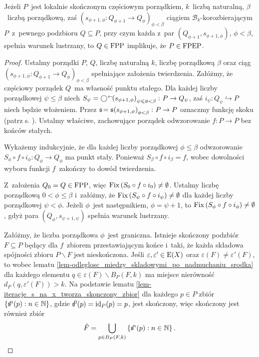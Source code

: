 \begin{tw}\label{tw-loc_fin_fpp_thm_dism_1}
Jeżeli $P$~jest lokalnie skończonym częściowym porządkiem, $k$~liczbą naturalną, $\beta$~liczbą porządkową, zaś $\left(s_{\phi+1,\phi}\colon Q_{\phi+1}\to Q_\phi\right)_{\phi<\beta}$ ciągiem \mbox{$\mathcal{B}_k$-korozbierającym} $P$~z~pewnego podzbioru $Q\subseteq P$, przy czym każda z~par $\left(Q_{\phi+1},s_{\phi+1,\phi}\right)$, $\phi<\beta$, spełnia warunek lustrzany, to $Q\in\mathrm{FPP}$ implikuje, że $P\in\mathrm{FPEP}$.
\end{tw}
\begin{proof}
Ustalmy porządki $P$, $Q$, liczbę naturalną $k$, liczbę porządkową $\beta$ oraz ciąg $\left(s_{\phi+1,\phi}\colon Q_{\phi+1}\to Q_\phi\right)_{\phi<\beta}$ spełniające założenia twierdzenia. Załóżmy, że częściowy porządek $Q$~ma własność punktu stałego. Dla każdej liczby porządkowej $\psi\leq\beta$ niech $S_\psi=\bigcirc^\leftarrow\!\!\left(s_{\phi+1,\phi}\right)_{\psi\leqslant \phi<\beta}\colon P\to Q_\psi$, zaś $i_\psi\colon Q_\psi\hookrightarrow P$ niech będzie włożeniem. Przez $\mathfrak{s}\!=\mathfrak{s}\!\left(s_{\phi+1,\phi}\right)_{\phi<\beta}\colon P\to P$ oznaczmy funkcję skoku (patrz s. \pageref{def-nieskonczone_zlozenie_korozbierajacego_ciagu}). Ustalmy właściwe, zachowujące porządek odwzorowanie $f\colon P\to P$ bez końców stałych.

Wykażemy indukcyjnie, że dla każdej liczby porządkowej $\phi\leq\beta$ odwzorowanie $S_\phi\circ f\circ i_\phi\colon Q_\phi\to Q_\phi$ ma punkt stały. Ponieważ $S_\beta\circ f\circ i_\beta=f$, wobec dowolności wyboru funkcji $f$~zakończy to dowód twierdzenia.

Z~założenia $Q_0=Q\in\mathrm{FPP}$, więc $\operatorname{Fix}\left(S_0\circ f\circ i_0\right)\not=\emptyset$. Ustalmy liczbę porządkową $0<\phi\leq\beta$ i~załóżmy, że $\operatorname{Fix}\left(S_\psi\circ f\circ i_\psi\right)\not=\emptyset$ dla każdej liczby porządkowej $\psi<\phi$. Jeżeli $\phi$~jest następnikiem, $\phi=\psi+1$, to $\operatorname{Fix}\left(S_{\phi}\circ f\circ i_{\phi}\right)\not=\emptyset$, gdyż para $\left(Q_{\phi},s_{\psi+1,\psi}\right)$ spełnia warunek lustrzany. 

Załóżmy, że liczba porządkowa $\phi$~jest graniczna. Istnieje skończony podzbiór $F\subseteq P$ będący dla $f$~zbiorem przestawiającym końce i~taki, że każda składowa spójności zbioru $P\smallsetminus F$ jest nieskończona. Jeśli $\varepsilon,\varepsilon'\in \mathrm{E}(X)$ oraz $\varepsilon(F)\not=\varepsilon'(F)$, to wobec lematu \ref{lem-odleglosc_miedzy_skladowymi_po_nadmuchaniu_srodka} dla każdego elementu $q\in \varepsilon(F)\smallsetminus B_P(F,k)$ ma miejsce nierówność $d_P\left(q,\varepsilon'(F)\right)> k$. Na podstawie lematu \ref{lem-iteracje_s_na_x_tworza_skonczony_zbior} dla każdego $p\in P$ zbiór $\{\mathfrak{s}\!^n(p):n\in\mathbb{N}\}$, gdzie $\mathfrak{s}\!^0(p)=\operatorname{id}_P(p)=p$, jest skończony, więc skończony jest również zbiór \[\hat{F}=\bigcup_{p\in B_P(F,k)}\left\{\mathfrak{s}\!^n(p):n\in\mathbb{N}\right\}.\]


\end{proof}
